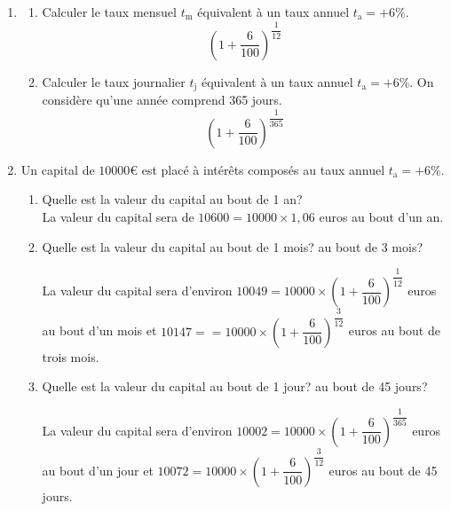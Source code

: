 \documentclass[french]{book}
\begin{document}
\begin{corrige}
\begin{enumerate}
\item 
\begin{enumerate}
\item Calculer le taux mensuel $t_{\mathrm{m}}$ équivalent à un taux annuel $t_{\mathrm{a}}=+6 \%$.\\

$$(1+\dfrac{6}{100})^{\dfrac{1}{12}}$$

\item Calculer le taux journalier $t_{\mathrm{j}}$ équivalent à un taux annuel $t_{\mathrm{a}}=+6 \%$. On considère qu'une année comprend 365 jours.\\

$$(1+\dfrac{6}{100})^{\dfrac{1}{365}}$$

\end{enumerate}

\item Un capital de $10000 €$ est placé à intérêts composés au taux annuel $t_{\mathrm{a}}=+6 \%$.

\begin{enumerate}
\item Quelle est la valeur du capital au bout de 1 an? \\

La valeur du capital sera de $10600=10000\times 1,06$ euros au bout d'un an.


\item Quelle est la valeur du capital au bout de 1 mois? au bout de 3 mois?

La valeur du capital sera d'environ $10049=10000\times (1+\dfrac{6}{100})^{\dfrac{1}{12}}$ euros au bout d'un mois et $10147==10000\times (1+\dfrac{6}{100})^{\dfrac{3}{12}}$ euros au bout de trois mois.


\item Quelle est la valeur du capital au bout de 1 jour? au bout de 45 jours? 

La valeur du capital sera d'environ $10002=10000\times (1+\dfrac{6}{100})^{\dfrac{1}{365}}$ euros au bout d'un jour et $10072=10000\times (1+\dfrac{6}{100})^{\dfrac{3}{12}}$ euros au bout de 45 jours.


\end{enumerate}
\end{enumerate}
\end{corrige}
\end{document}
